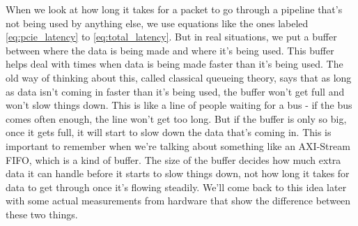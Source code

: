When we look at how long it takes for a packet to go through a pipeline that's not being used by anything else, we use equations like the ones labeled \ref{eq:pcie_latency} to \ref{eq:total_latency}. But in real situations, we put a buffer between where the data is being made and where it's being used. This buffer helps deal with times when data is being made faster than it's being used. The old way of thinking about this, called classical queueing theory, says that as long as data isn't coming in faster than it's being used, the buffer won't get full and won't slow things down. This is like a line of people waiting for a bus - if the bus comes often enough, the line won't get too long. But if the buffer is only so big, once it gets full, it will start to slow down the data that's coming in. This is important to remember when we're talking about something like an AXI-Stream FIFO, which is a kind of buffer. The size of the buffer decides how much extra data it can handle before it starts to slow things down, not how long it takes for data to get through once it's flowing steadily. We'll come back to this idea later with some actual measurements from hardware that show the difference between these two things.